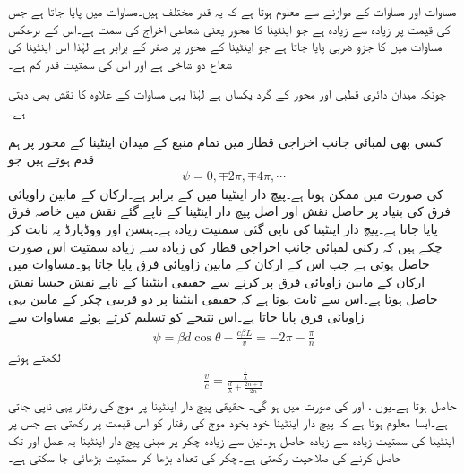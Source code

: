 مساوات  اور  مساوات  کے موازنے سے معلوم ہوتا ہے کہ یہ قدر مختلف ہیں۔مساوات  میں  پایا جاتا ہے جس کی قیمت  پر زیادہ سے زیادہ ہے جو اینٹینا کا محور یعنی شعاعی اخراج کی سمت  ہے۔اس کے برعکس مساوات  میں  کا جزو ضربی پایا جاتا ہے جو اینٹینا کے محور پر صفر کے برابر ہے لہٰذا اس اینٹینا کی شعاع دو شاخی ہے اور اس کی سمتیت قدر کم ہے۔

چونکہ میدان دائری قطبی اور محور کے گرد یکساں ہے لہٰذا یہی مساوات  کے علاوہ  کا نقش بھی دیتی ہے۔

کسی بھی لمبائی جانب اخراجی قطار  میں تمام منبع کے میدان اینٹینا کے محور پر ہم قدم  ہوتے ہیں جو
\begin{align}
\psi=0, \mp 2\pi, \mp  4\pi, \cdots
\end{align}
کی صورت میں ممکن ہوتا ہے۔پیچ دار اینٹینا میں  کے برابر ہے۔ارکان کے مابین  زاویائی فرق کی بنیاد پر حاصل نقش اور اصل پیچ دار اینٹینا کے ناپے گئے نقش میں خاصہ فرق پایا جاتا ہے۔پیچ دار اینٹینا کی ناپی گئی سمتیت زیادہ ہے۔ہنسن اور ووڈیارڈ یہ ثابت کر چکے ہیں کہ  رکنی لمبائی جانب اخراجی قطار کی زیادہ سے زیادہ سمتیت اس صورت حاصل ہوتی ہے جب اس کے ارکان کے مابین  زاویائی فرق پایا جاتا ہو۔مساوات  میں ارکان کے مابین زاویائی فرق  پر کرنے سے حقیقی اینٹینا کے ناپے نقش  جیسا نقش حاصل ہوتا ہے۔اس سے ثابت ہوتا ہے کہ حقیقی اینٹینا پر دو قریبی چکر کے مابین یہی زاویائی فرق پایا جاتا ہے۔اس نتیجے کو تسلیم کرتے ہوئے مساوات  سے
\begin{align}
\psi=\beta d \cos \theta- \frac{c \beta L}{v}=-2\pi-\frac{\pi}{n}
\end{align}
لکھتے ہوئے  
\begin{align}
\frac{v}{c}=\frac{\frac{1}{\lambda}}{\frac{d}{\lambda}+\frac{2n+1}{2n}}
\end{align} 
حاصل ہوتا ہے۔یوں ،  اور  کی صورت میں  ہو گی۔
حقیقی پیچ دار اینٹینا پر موج کی رفتار یہی ناپی جاتی ہے۔ایسا معلوم ہوتا ہے کہ پیچ دار اینٹینا خود بخود موج کی رفتار کو اس قیمت پر رکھتی ہے جس پر اینٹینا کی سمتیت زیادہ سے زیادہ حاصل ہو۔تین سے زیادہ چکر پر مبنی پیچ دار اینٹینا یہ عمل  اور  تک حاصل کرنے کی صلاحیت رکھتی ہے۔چکر کی تعداد بڑھا کر سمتیت بڑھائی جا سکتی ہے۔

